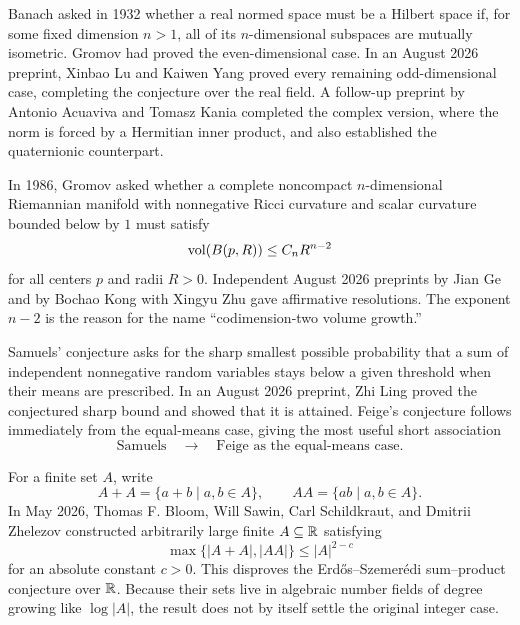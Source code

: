     \begin{fact}
        Banach asked in 1932 whether a real normed space must be a Hilbert space
        if, for some fixed dimension $n>1$, all of its $n$-dimensional subspaces
        are mutually isometric. Gromov had proved the even-dimensional case.
        In an August 2026 preprint, Xinbao Lu and Kaiwen Yang proved every
        remaining odd-dimensional case, completing the conjecture over the real
        field. A follow-up preprint by Antonio Acuaviva and Tomasz Kania completed
        the complex version, where the norm is forced by a Hermitian inner
        product, and also established the quaternionic counterpart.
    \end{fact}

    \begin{fact}
        In 1986, Gromov asked whether a complete noncompact $n$-dimensional
        Riemannian manifold with nonnegative Ricci curvature and scalar curvature
        bounded below by $1$ must satisfy
        \[
            \operatorname{vol}(B(p,R))\leq C_nR^{n-2}
        \]
        for all centers $p$ and radii $R>0$. Independent August 2026 preprints by
        Jian Ge and by Bochao Kong with Xingyu Zhu gave affirmative resolutions.
        The exponent $n-2$ is the reason for the name ``codimension-two volume
        growth.''
    \end{fact}

    \begin{fact}
        Samuels' conjecture asks for the sharp smallest possible probability that
        a sum of independent nonnegative random variables stays below a given
        threshold when their means are prescribed. In an August 2026 preprint,
        Zhi Ling proved the conjectured sharp bound and showed that it is
        attained. Feige's conjecture follows immediately from the equal-means
        case, giving the most useful short association
        \[
            \text{Samuels}\quad\longrightarrow\quad
            \text{Feige as the equal-means case}.
        \]
    \end{fact}

    \begin{fact}
        For a finite set $A$, write
        \[
            A+A=\{a+b\mid a,b\in A\},
            \qquad
            AA=\{ab\mid a,b\in A\}.
        \]
        In May 2026, Thomas F. Bloom, Will Sawin, Carl Schildkraut, and Dmitrii
        Zhelezov constructed arbitrarily large finite $A\subseteq\mathbb{R}$ satisfying
        \[
            \max\{|A+A|,|AA|\}\leq |A|^{2-c}
        \]
        for an absolute constant $c>0$. This disproves the Erd\H{o}s--Szemer\'edi
        sum--product conjecture over $\mathbb{R}$. Because their sets live in algebraic
        number fields of degree growing like $\log|A|$, the result does not by
        itself settle the original integer case.
    \end{fact}


